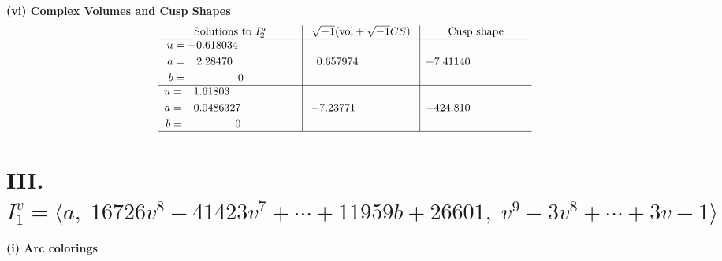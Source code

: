 \documentclass[1p]{elsarticle_modified}
\theoremstyle{definition}
\newcommand{\I}{\sqrt{-1}}
\begin{document}
\newpage\flushleft \textbf{(vi) Complex Volumes and Cusp Shapes}
$$\begin{array}{c|c|c}  
\text{Solutions to }I^u_{2}& \I (\text{vol} + \sqrt{-1}CS) & \text{Cusp shape}\\
 \hline 
\begin{aligned}
u &= -0.618034\phantom{ +0.000000I} \\
a &= \phantom{-}2.28470\phantom{ +0.000000I} \\
b &= \phantom{-0.000000 } 0\end{aligned}
 & \phantom{-}0.657974\phantom{ +0.000000I} & -7.41140\phantom{ +0.000000I} \\ \hline\begin{aligned}
u &= \phantom{-}1.61803\phantom{ +0.000000I} \\
a &= \phantom{-}0.0486327\phantom{ +0.000000I} \\
b &= \phantom{-0.000000 } 0\end{aligned}
 & -7.23771\phantom{ +0.000000I} & -424.810\phantom{ +0.000000I}\\
 \hline 
 \end{array}$$\newpage\newpage\renewcommand{\arraystretch}{1}
\centering \section*{III. $I^v_{1}= \langle a,\;16726 v^8-41423 v^7+\cdots+11959 b+26601,\;v^9-3 v^8+\cdots+3 v-1 \rangle$}
\flushleft \textbf{(i) Arc colorings}\\
\end{document}
